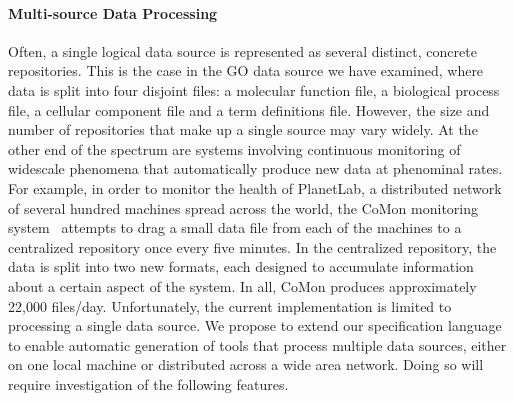 \documentclass[11pt]{article}
\begin{document}
\paragraph*{Multi-source Data Processing}
Often, a single logical data source is represented
as several distinct, concrete repositories.   This is the case
in the GO data source we have examined, where data is split into four disjoint
files: a molecular function file, a biological process file,
a cellular component file and a term definitions file.
However, the size and number of repositories that make up a single source
may vary widely.  At the other end of the spectrum are systems involving
continuous monitoring of widescale phenomena that automatically
produce new data at phenominal rates.  For example, in order to monitor
the health of PlanetLab, a distributed network of several hundred machines
spread across the world, the CoMon monitoring system~\cite{comon} attempts to 
drag a small data file from each of the machines to a centralized repository once every
five minutes.  In the
centralized repository, the data is split into two new formats, each designed to accumulate
information about a certain aspect of the system.  In all, CoMon produces
approximately 22,000 files/day.  Unfortunately, the current \pads{} 
implementation is limited to processing a single data source.
We propose to extend our specification language to enable 
automatic generation of tools
that process multiple data sources, either on one local machine or distributed across a wide area network.  Doing so will require investigation of the 
following features.
\end{document}
